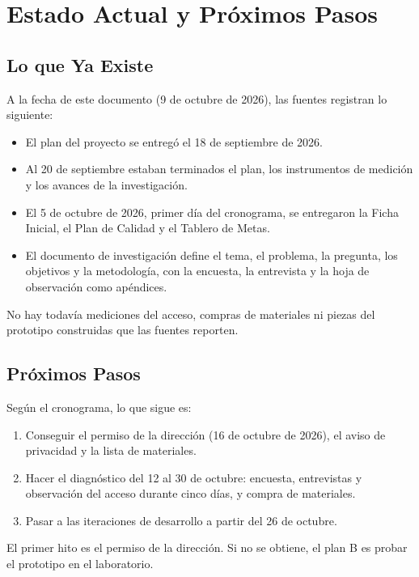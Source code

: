\section{Estado Actual y Próximos Pasos}
\subsection{Lo que Ya Existe}
A la fecha de este documento (9 de octubre de 2026), las fuentes registran lo
siguiente:
\begin{itemize}
	\item El plan del proyecto se entregó el 18 de septiembre de 2026.
	\item Al 20 de septiembre estaban terminados el plan, los instrumentos de
	      medición y los avances de la investigación.
	\item El 5 de octubre de 2026, primer día del cronograma, se entregaron la
	      Ficha Inicial, el Plan de Calidad y el Tablero de Metas.
	\item El documento de investigación define el tema, el problema, la
	      pregunta, los objetivos y la metodología, con la encuesta, la entrevista y
	      la hoja de observación como apéndices.
\end{itemize}
No hay todavía mediciones del acceso, compras de materiales ni piezas del
prototipo construidas que las fuentes reporten.

\subsection{Próximos Pasos}
Según el cronograma, lo que sigue es:
\begin{enumerate}
	\item Conseguir el permiso de la dirección (16 de octubre de 2026), el
	      aviso de privacidad y la lista de materiales.
	\item Hacer el diagnóstico del 12 al 30 de octubre: encuesta, entrevistas y
	      observación del acceso durante cinco días, y compra de materiales.
	\item Pasar a las iteraciones de desarrollo a partir del 26 de octubre.
\end{enumerate}
El primer hito es el permiso de la dirección. Si no se obtiene, el plan B es
probar el prototipo en el laboratorio.

